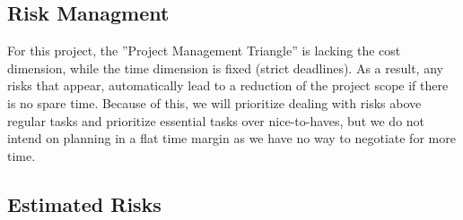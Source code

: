\subsection{Risk Managment}
For this project, the ”Project Management Triangle” is lacking the cost dimension, while the time dimension is fixed (strict deadlines). As a result, any risks that appear, automatically lead to a reduction of the project scope if there is no spare time. Because of this, we will prioritize dealing with risks above regular tasks and prioritize essential tasks over nice-to-haves, but we do not intend on planning in a flat time margin as we have no way to negotiate for more time.

\subsection{Estimated Risks}

